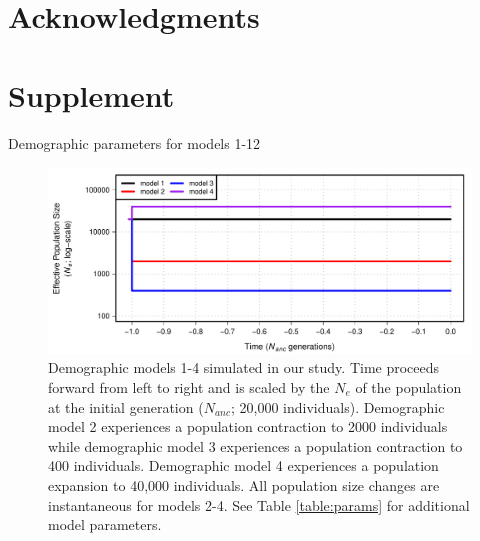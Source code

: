 \documentclass[9pt,twocolumn,twoside]{rilabRxiv}
\newcommand{\beginsupplement}{%
        \setcounter{table}{0}
        \renewcommand{\thetable}{S\arabic{table}}%
        \setcounter{figure}{0}
        \renewcommand{\thefigure}{S\arabic{figure}}%
     }
\begin{document}
\section{Acknowledgments}




\onecolumn

\beginsupplement
\section*{Supplement}

\begin{table}

\caption{Demographic parameters for models 1-12}
\label{table:params}
\end{table}
\pagebreak

\begin{figure}[h!]
\includegraphics[width=0.8\linewidth]{figures/FigS1.pdf}
\caption{Demographic models 1-4 simulated in our study.
Time proceeds forward from left to right and is scaled by the $N_e$ of the population at the initial generation ($N_{anc}$; 20,000 individuals).
Demographic model 2 experiences a population contraction to 2000 individuals while demographic model 3 experiences a population contraction to 400 individuals.
Demographic model 4 experiences a population expansion to 40,000 individuals.
All population size changes are instantaneous for models 2-4.
See Table \ref{table:params} for additional model parameters.}
\label{fig:models1}
\end{figure}
\pagebreak
\end{document}
